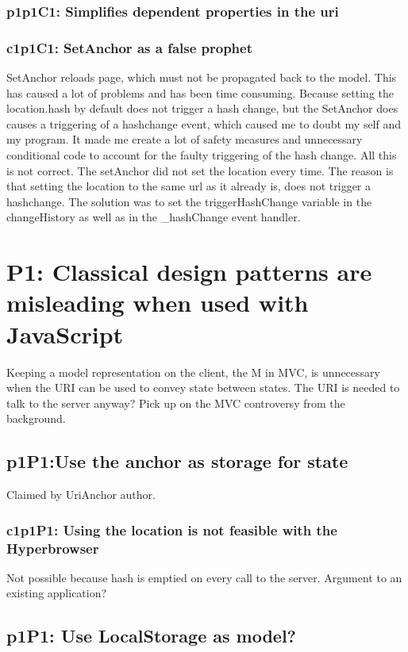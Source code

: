 \documentclass[english]{ifimaster}
\begin{document}
\subsubsection{p1p1C1: Simplifies dependent properties in the uri}
\subsubsection{c1p1C1: SetAnchor as a false prophet} 
SetAnchor reloads page, which must not be propagated back to the model. This has caused a lot of problems and has been time consuming. Because setting the location.hash by default does not trigger a hash change, but the SetAnchor does causes a triggering of a hashchange event, which caused me to doubt my self and my program. It made me create a lot of safety measures and unnecessary conditional code to account for the faulty triggering of the hash change. All this is not correct. The setAnchor did not set the location every time. The reason is that setting the location to the same url as it already is, does not trigger a hashchange. The solution was to set the triggerHashChange variable in the changeHistory as well as in the \_hashChange event handler.

\section{P1: Classical design patterns are misleading when used with JavaScript}
Keeping a model representation on the client, the M in MVC, is unnecessary when the URI can be used to convey state between states. The URI is needed to talk to the server anyway?  Pick up on the MVC controversy from the background.
\subsection{p1P1:Use the anchor as storage for state}
Claimed by UriAnchor author.

\subsubsection{c1p1P1: Using the location is not feasible with the Hyperbrowser}
Not possible because hash is emptied on every call to the server. Argument to an existing application?
\subsection{p1P1: Use LocalStorage as model?}
\end{document}

